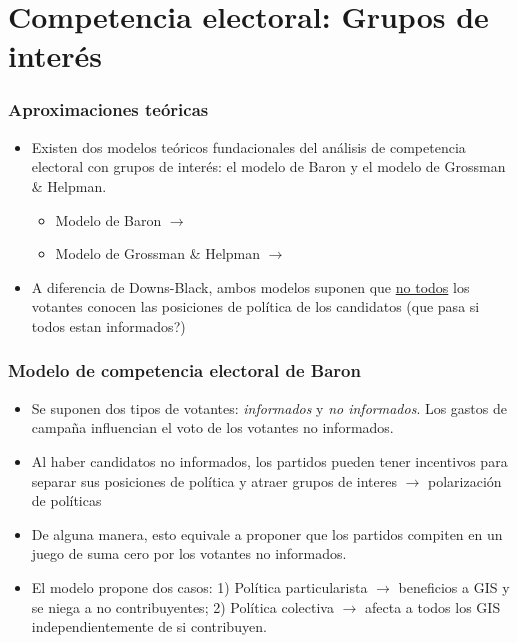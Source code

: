 \documentclass[14pt,aspectratio=169]{beamer}
\begin{document}
    

\section{Competencia electoral: Grupos de interés}


\begin{frame}\frametitle{Aproximaciones teóricas}
\begin{itemize}\itemsep 15pt
\item Existen dos modelos teóricos fundacionales del análisis de
  competencia electoral con grupos de interés: el modelo de Baron y el
  modelo de Grossman \& Helpman. 
\begin{itemize} \itemsep 15pt \medskip 
\item Modelo de Baron $\longrightarrow$ 
\item Modelo de Grossman \& Helpman $\longrightarrow$
\end{itemize}
\item A diferencia de Downs-Black, ambos modelos suponen que
  \underline{no todos} los votantes conocen las posiciones de política
  de los candidatos (que pasa si todos estan informados?)
\end{itemize}
\end{frame}


\begin{frame}\frametitle{Modelo de competencia electoral de Baron}
\begin{itemize}\itemsep 15pt
\item Se suponen dos tipos de votantes: \textit{informados} y
  \textit{no informados}. Los gastos de campaña influencian el voto de
  los votantes no informados.
\item Al haber candidatos no informados, los partidos pueden tener
  incentivos para separar sus posiciones de política y atraer grupos
  de interes $\longrightarrow$ polarización de políticas
\item De alguna manera, esto equivale a proponer que los partidos
  compiten en un juego de suma cero por los votantes no informados. 
\item El modelo propone dos casos: 1) Política particularista
  $\longrightarrow$ beneficios a GIS y se niega a no contribuyentes;
  2) Política colectiva $\longrightarrow$ afecta a todos los GIS
  independientemente de si contribuyen. 
\end{itemize}
\end{frame}
\end{document}

